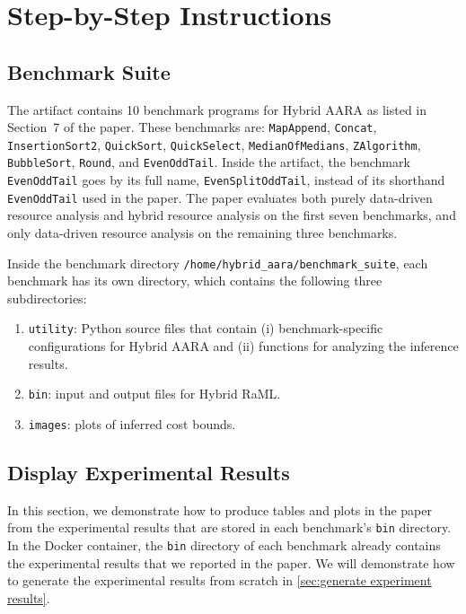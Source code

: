 
\section{Step-by-Step Instructions}

\subsection{Benchmark Suite}

The artifact contains 10 benchmark programs for Hybrid AARA as listed in
Section~7 of the paper.
%
These benchmarks are: \texttt{MapAppend}, \texttt{Concat},
\texttt{InsertionSort2}, \texttt{QuickSort}, \texttt{QuickSelect},
\texttt{MedianOfMedians}, \texttt{ZAlgorithm}, \texttt{BubbleSort},
\texttt{Round}, and \texttt{EvenOddTail}.
%
Inside the artifact, the benchmark \texttt{EvenOddTail} goes by its full name,
\texttt{EvenSplitOddTail}, instead of its shorthand \texttt{EvenOddTail} used
in the paper.
%
The paper evaluates both purely data-driven resource analysis and hybrid
resource analysis on the first seven benchmarks, and only data-driven resource
analysis on the remaining three benchmarks.

Inside the benchmark directory \texttt{/home/hybrid\_aara/benchmark\_suite},
each benchmark has its own directory, which contains the following three
subdirectories:
\begin{enumerate}
  \item \texttt{utility}: Python source files that contain (i)
        benchmark-specific configurations for Hybrid AARA and (ii) functions for
        analyzing the inference results.
  \item \texttt{bin}: input and output files for Hybrid RaML.
  \item \texttt{images}: plots of inferred cost bounds.
\end{enumerate}

\subsection{Display Experimental Results}
\label{sec:display experiment results}

In this section, we demonstrate how to produce tables and plots in the paper
from the experimental results that are stored in each benchmark's \texttt{bin}
directory.
%
In the Docker container, the \texttt{bin} directory of each benchmark already
contains the experimental results that we reported in the paper.
%
We will demonstrate how to generate the experimental results from scratch in
\cref{sec:generate experiment results}.

